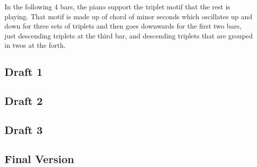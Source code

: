 \documentclass{article}
\begin{document}
In the following 4 bars, the piano support the triplet motif that the rest is
playing. That motif is made up of chord of minor seconds which oscillates up
and down for three sets of triplets and then goes downwards for the first two
bars, just descending triplets at the third bar, and descending triplets
that are grouped in twos at the forth.

\newpage
\begin{center}
\vspace*{\fill}
\LARGE
\subsection{Draft 1}
\vspace*{\fill}
%
\end{center}
\newpage
\begin{center}
\vspace*{\fill}
\LARGE
\subsection{Draft 2}
\vspace*{\fill}
%
\end{center}
\newpage
\begin{center}
\vspace*{\fill}
\LARGE
\subsection{Draft 3}
\vspace*{\fill}
%
\end{center}
\newpage
\begin{center}
\vspace*{\fill}
\LARGE
\subsection{Final Version}
\vspace*{\fill}
%
\end{center}

\end{document}
